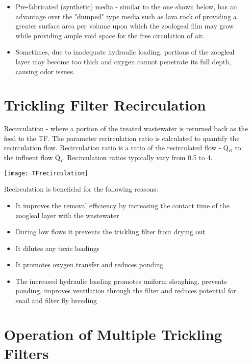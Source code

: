 \begin{itemize}
\item Pre-fabricated (synthetic) media - similar to the one shown below, has an advantage over the "dumped" type media such as lava rock of providing a greater surface area per volume upon which the zoologeal film may grow while providing ample void space for the free circulation of air.

\item Sometimes, due to inadequate hydraulic loading, portions of the zoogleal layer may become too thick and oxygen cannot penetrate its full depth, causing odor issues.

\end{itemize}


\section{Trickling Filter Recirculation}

Recirculation - where a portion of the treated wastewater is returned back as the feed to the TF.  The parameter recirculation ratio is calculated to quantify the recirculation flow.  Recirculation ratio is a ratio of the recirculated flow - Q$_R$ to the influent flow Q$_I$. Recirculation ratios typically vary from 0.5 to 4.
\begin{center}
\texttt{[image: TFrecirculation]}
\end{center}
Recirculation is beneficial for the following reasons:
\begin{itemize}
\item It improves the removal efficiency by increasing the contact time of the zoogleal layer with the wastewater
\item During low flows it prevents the trickling filter from drying out
\item It dilutes any toxic loadings
\item It promotes oxygen transfer and reduces ponding
\item The increased hydraulic loading promotes uniform sloughing, prevents ponding, improves ventilation through the filter and reduces potential for snail and filter fly breeding
\end{itemize}
\section{Operation of Multiple Trickling Filters}

